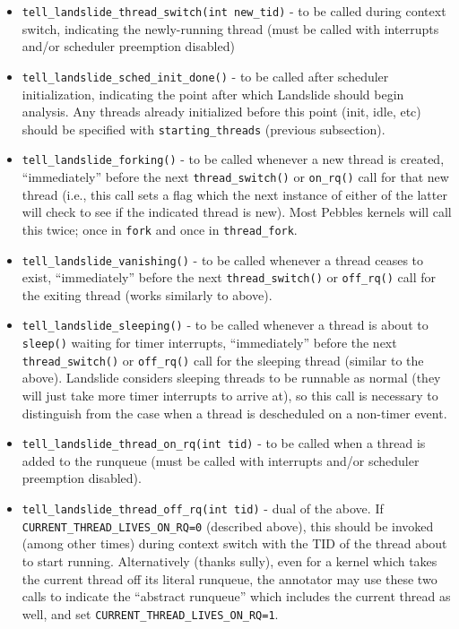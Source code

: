 \begin{itemize}
	\item {\tt tell\_landslide\_thread\_switch(int new\_tid)} - to be called during context switch, indicating the newly-running thread
		(must be called with interrupts and/or scheduler preemption disabled)
	\item {\tt tell\_landslide\_sched\_init\_done()} - to be called after scheduler initialization,
		indicating the point after which Landslide should begin analysis.
		Any threads already initialized before this point (init, idle, etc) should be specified with {\tt starting\_threads} (previous subsection).
	\item {\tt tell\_landslide\_forking()} - to be called whenever a new thread is created,
		``immediately'' before the next {\tt thread\_switch()} or {\tt on\_rq()} call for that new thread (i.e., this call sets a flag which the next instance of either of the latter will check to see if the indicated thread is new).
		Most Pebbles kernels will call this twice; once in {\tt fork} and once in {\tt thread\_fork}.
	\item {\tt tell\_landslide\_vanishing()} - to be called whenever a thread ceases to exist,
		``immediately'' before the next {\tt thread\_switch()} or {\tt off\_rq()} call for the exiting thread
		(works similarly to above).
	\item {\tt tell\_landslide\_sleeping()} - to be called whenever a thread is about to {\tt sleep()} waiting for timer interrupts,
		``immediately'' before the next {\tt thread\_switch()} or {\tt off\_rq()} call for the sleeping thread
		(similar to the above).
		Landslide considers sleeping threads to be runnable as normal (they will just take more timer interrupts to arrive at),
		so this call is necessary to distinguish from the case when a thread is descheduled on a non-timer event.
	\item {\tt tell\_landslide\_thread\_on\_rq(int tid)} - to be called when a thread is added to the runqueue
		(must be called with interrupts and/or scheduler preemption disabled).
	\item {\tt tell\_landslide\_thread\_off\_rq(int tid)} - dual of the above.
		If {\tt CURRENT\_THREAD\_\allowbreak{}LIVES\_ON\_RQ=0} (described above), this should be invoked (among other times) during context switch with the TID of the thread about to start running.
		Alternatively (thanks sully), even for a kernel which takes the current thread off its literal runqueue,
		the annotator may use these two calls to indicate the ``abstract runqueue'' which includes the current thread as well,
		and set {\tt CURRENT\_THREAD\_LIVES\_ON\_RQ=1}.
\end{itemize}

